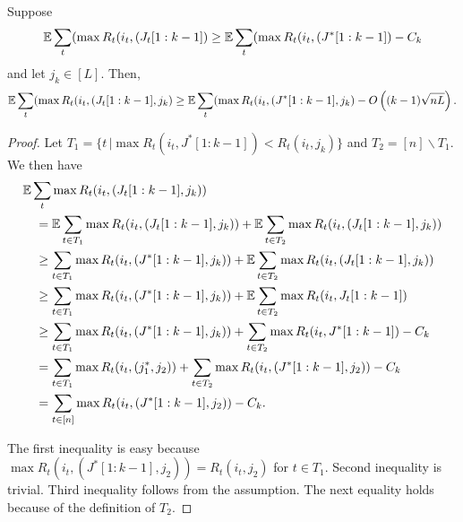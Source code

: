 \begin{lemma}
\label{lem:keyinequality}
Suppose
 $$ \mathbb{E} \sum_t (\max R_t(i_t,(J_t[1:k-1]) \geq  \mathbb{E} \sum_t (\max R_t(i_t,(J^*[1:k-1])  - C_k$$
  and let $j_k \in [L].$ Then,
$$ \mathbb{E} \sum_t (\max R_t(i_t,(J_t[1:k-1],j_k) \geq \mathbb{E} \sum_t (\max R_t(i_t,(J^*[1:k-1],j_k) - O\left((k-1) \sqrt{nL} \right).$$
\end{lemma}

\begin{proof}
 Let $T_1 = \{ t \, | \max R_t(i_t,J^*[1:k-1]) < R_t(i_t,j_k) \}$ and $T_2 = [n] \backslash T_1 .$ We then have 
\begin{align*}
  & \mathbb{E} \sum_t \max R_t(i_t,(J_t[1:k-1],j_k)) \\
  & \quad = \mathbb{E}\sum_{t \in T_1} \max R_t(i_t,(J_t[1:k-1],j_k)) + \mathbb{E}\sum_{t \in T_2} \max R_t(i_t,(J_t[1:k-1],j_k)) \\
  & \quad \geq \sum_{t \in T_1} \max R_t(i_t,(J^*[1:k-1],j_k)) + \mathbb{E}\sum_{t \in T_2} \max R_t(i_t,(J_t[1:k-1],j_k)) \\
  & \quad \geq \sum_{t \in T_1} \max R_t(i_t,(J^*[1:k-1],j_k)) + \mathbb{E}\sum_{t \in T_2} \max R_t(i_t,J_t[1:k-1]) \\
  & \quad \geq \sum_{t \in T_1} \max R_t(i_t,(J^*[1:k-1],j_k)) + \sum_{t \in T_2} \max R_t(i_t,J^*[1:k-1]) - C_k \\
  & \quad = \sum_{t \in T_1} \max R_t(i_t,(j_1^*,j_2)) + \sum_{t \in T_2} \max R_t(i_t,(J^*[1:k-1],j_2)) - C_k \\
  & \quad = \sum_{t \in [n]} \max R_t(i_t,(J^*[1:k-1],j_2)) - C_k.
\end{align*}

The first inequality is easy because $\max R_t(i_t,(J^*[1:k-1],j_2)) = R_t(i_t,j_2)$ for $t \in T_1$. Second inequality is trivial. Third inequality follows from the assumption. The next equality holds because of the definition of $T_2$.  
\end{proof}


